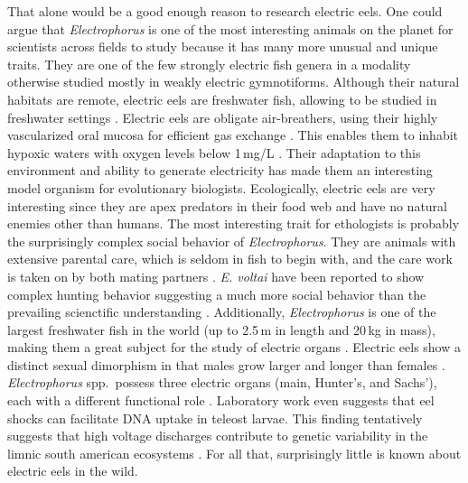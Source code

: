 That alone would be a good enough reason to research electric eels. 
One could argue that \textit{Electrophorus} is one of the most interesting animals on the planet for scientists across fields to study because it has many more unusual and unique traits. 
They are one of the few strongly electric fish genera in a modality otherwise studied mostly in weakly electric gymnotiforms. 
Although their natural habitats are remote, electric eels are freshwater fish, allowing to be studied in freshwater settings \parencite{mendes2016biology,santana2019unexpected}.
Electric eels are obligate air-breathers, using their highly vascularized oral mucosa for efficient gas exchange \parencite{johansen1968gas}. 
This enables them to inhabit hypoxic waters with oxygen levels below 1\,mg/L \parencite{barbara2010araguari}.
Their adaptation to this environment and ability to generate electricity has made them an interesting model organism for evolutionary biologists. 
Ecologically, electric eels are very interesting since they are apex predators in their food web and have no natural enemies other than humans. 
The most interesting trait for ethologists is probably the surprisingly complex social behavior of \textit{Electrophorus}. 
They are animals with extensive parental care, which is seldom in fish to begin with, and the care work is taken on by both mating partners \parencite{bastos2020historia,assunccao1995reproduction}.
\textit{E. voltai} have been reported to show complex hunting behavior suggesting a much more social behavior than the prevailing scienctific understanding \parencite{bastos2021social}. 
Additionally, \textit{Electrophorus} is one of the largest freshwater fish in the world (up to 2.5\,m in length and 20\,kg in mass), making them a great subject for the study of electric organs 
\parencite{mendes2016biology}.
Electric eels show a distinct sexual dimorphism in that males grow larger and longer than females \parencite{mendes2016biology}.
\textit{Electrophorus} spp.\ possess three electric organs (main, Hunter's, and Sachs'), each with a different functional role \parencite{xu2021third}.
Laboratory work even suggests that eel shocks can facilitate DNA uptake in teleost larvae. 
This finding tentatively suggests that high voltage discharges contribute to genetic variability in the limnic south american ecosystems \parencite{sakaki2023electric}. 
For all that, surprisingly little is known about electric eels in the wild.

